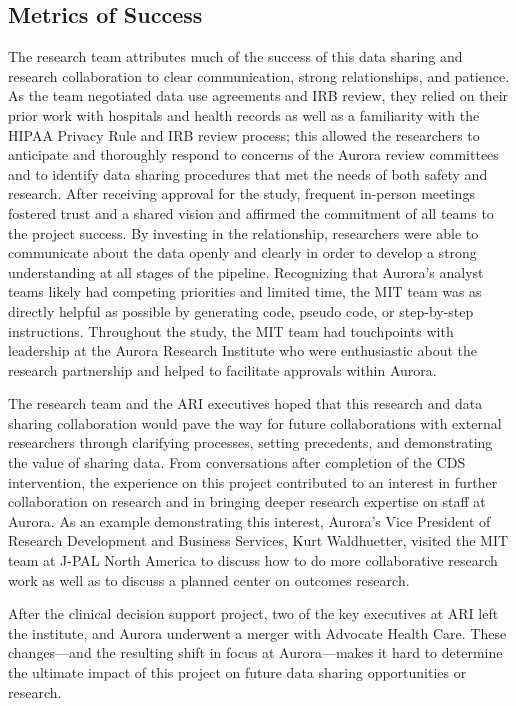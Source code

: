\hypertarget{metrics-of-success-3}{%
\subsection{Metrics of Success}\label{metrics-of-success-3}}

The research team attributes much of the success of this data sharing and research collaboration to clear communication, strong relationships, and patience. As the team negotiated data use agreements and IRB review, they relied on their prior work with hospitals and health records as well as a familiarity with the HIPAA Privacy Rule and IRB review process; this allowed the researchers to anticipate and thoroughly respond to concerns of the Aurora review committees and to identify data sharing procedures that met the needs of both safety and research. After receiving approval for the study, frequent in-person meetings fostered trust and a shared vision and affirmed the commitment of all teams to the project success. By investing in the relationship, researchers were able to communicate about the data openly and clearly in order to develop a strong understanding at all stages of the pipeline. Recognizing that Aurora's analyst teams likely had competing priorities and limited time, the MIT team was as directly helpful as possible by generating code, pseudo code, or step-by-step instructions. Throughout the study, the MIT team had touchpoints with leadership at the Aurora Research Institute who were enthusiastic about the research partnership and helped to facilitate approvals within Aurora.

The research team and the ARI executives hoped that this research and data sharing collaboration would pave the way for future collaborations with external researchers through clarifying processes, setting precedents, and demonstrating the value of sharing data. From conversations after completion of the CDS intervention, the experience on this project contributed to an interest in further collaboration on research and in bringing deeper research expertise on staff at Aurora. As an example demonstrating this interest, Aurora's Vice President of Research Development and Business Services, Kurt Waldhuetter, visited the MIT team at J-PAL North America to discuss how to do more collaborative research work as well as to discuss a planned center on outcomes research.

After the clinical decision support project, two of the key executives at ARI left the institute, and Aurora underwent a merger with Advocate Health Care. These changes---and the resulting shift in focus at Aurora---makes it hard to determine the ultimate impact of this project on future data sharing opportunities or research.

